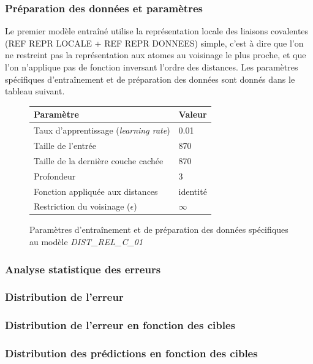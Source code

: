 \subsubsection{Préparation des données et paramètres}
Le premier modèle entraîné utilise la représentation locale des liaisons covalentes (REF REPR LOCALE + REF REPR DONNEES) simple, c'est à dire que l'on ne restreint pas la représentation aux atomes au voisinage le plus proche, et que l'on n'applique pas de fonction inversant l'ordre des distances. Les paramètres spécifiques d'entraînement et de préparation des données sont donnés dans le tableau suivant.


\begin{figure}[!h]
	\centering
	\begin{tabular}{|l|l|}
		\hline
		\textbf{Paramètre} & \textbf{Valeur} \\ \hline
		Taux d'apprentissage (\emph{learning rate}) & 0.01 \\ \hline
		Taille de l'entrée & 870 \\ \hline
		Taille de la dernière couche cachée & 870 \\ \hline
		Profondeur & 3 \\ \hline
		Fonction appliquée aux distances & identité \\ \hline
		Restriction du voisinage ($\epsilon$) & $\infty$ \\ \hline
	\end{tabular}

	\caption{Paramètres d'entraînement et de préparation des données spécifiques au modèle \emph{DIST\_REL\_C\_01}}
\end{figure}

\subsubsection{Analyse statistique des erreurs}

\subsubsection{Distribution de l'erreur}

\subsubsection{Distribution de l'erreur en fonction des cibles}

\subsubsection{Distribution des prédictions en fonction des cibles}


